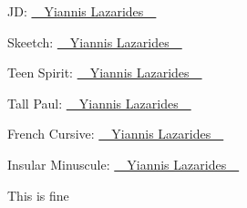 \documentclass{article}
\def\signyl{\ul{~~Yiannis Lazarides~~}}
\begin{document}
JD: {\ECFJD\setul{0.1ex}{}\signyl}

Skeetch: {\ECFSkeetch\setul{0.1ex}{}\signyl}

Teen Spirit: {\ECFTeenSpirit\setul{-0.1ex}{0.3pt}\signyl}

Tall Paul: {\ECFTallPaul\setul{0.15ex}{}\signyl}

French Cursive: {\cursive\setul{0.1ex}{}\signyl}

Insular Minuscule: {\iminfamily\setul{0.1ex}{}\signyl}

This is fine
\end{document}
